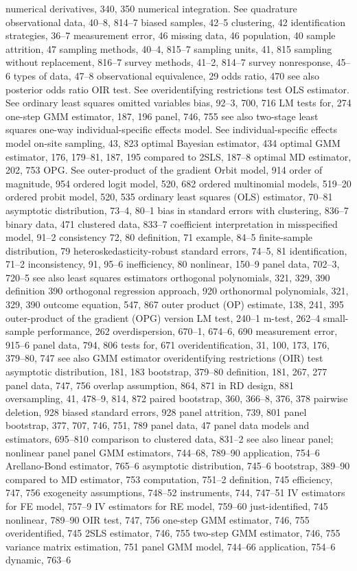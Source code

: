 numerical derivatives, 340, 350 numerical integration. See quadrature
observational data, 40–8, 814–7 biased samples, 42–5 clustering, 42
identification strategies, 36–7 measurement error, 46 missing data, 46
population, 40
sample attrition, 47
sampling methods, 40–4, 815–7 sampling units, 41, 815
sampling without replacement, 816–7 survey methods, 41–2, 814–7
survey nonresponse, 45–6
types of data, 47–8
observational equivalence, 29 odds ratio, 470
see also posterior odds ratio
OIR test. See overidentifying restrictions test OLS estimator. See ordinary least squares omitted variables bias, 92–3, 700, 716
LM tests for, 274
one-step GMM estimator, 187, 196
panel, 746, 755
see also two-stage least squares
one-way individual-specific effects model. See
individual-specific effects model
on-site sampling, 43, 823
optimal Bayesian estimator, 434
optimal GMM estimator, 176, 179–81, 187, 195
compared to 2SLS, 187–8
optimal MD estimator, 202, 753
OPG. See outer-product of the gradient
Orbit model, 914
order of magnitude, 954
ordered logit model, 520, 682
ordered multinomial models, 519–20
ordered probit model, 520, 535
ordinary least squares (OLS) estimator, 70–81
asymptotic distribution, 73–4, 80–1
bias in standard errors with clustering, 836–7 binary data, 471
clustered data, 833–7
coefficient interpretation in misspecified model,
91–2
consistency 72, 80
definition, 71
example, 84–5
finite-sample distribution, 79 heteroskedasticity-robust standard errors, 74–5, 81 identification, 71–2
inconsistency, 91, 95–6
inefficiency, 80
nonlinear, 150–9
panel data, 702–3, 720–5
see also least squares estimators
orthogonal polynomials, 321, 329, 390 definition 390
orthogonal regression approach, 920 orthonormal polynomials, 321, 329, 390 outcome equation, 547, 867
outer product (OP) estimate, 138, 241, 395 outer-product of the gradient (OPG) version
LM test, 240–1
m-test, 262–4
small-sample performance, 262
overdispersion, 670–1, 674–6, 690 measurement error, 915–6 panel data, 794, 806
tests for, 671
overidentification, 31, 100, 173, 176, 379–80, 747 see also GMM estimator
overidentifying restrictions (OIR) test asymptotic distribution, 181, 183 bootstrap, 379–80
definition, 181, 267, 277
panel data, 747, 756 overlap assumption, 864, 871
in RD design, 881 oversampling, 41, 478–9, 814, 872
paired bootstrap, 360, 366–8, 376, 378 pairwise deletion, 928
biased standard errors, 928
panel attrition, 739, 801
panel bootstrap, 377, 707, 746, 751, 789 panel data, 47
panel data models and estimators, 695–810
comparison to clustered data, 831–2 see also linear panel; nonlinear panel panel GMM estimators, 744–68, 789–90
application, 754–6
Arellano-Bond estimator, 765–6 asymptotic distribution, 745–6 bootstrap, 389–90
compared to MD estimator, 753 computation, 751–2
definition, 745
efficiency, 747, 756
exogeneity assumptions, 748–52 instruments, 744, 747–51
IV estimators for FE model, 757–9 IV estimators for RE model, 759–60 just-identified, 745
nonlinear, 789–90
OIR test, 747, 756
one-step GMM estimator, 746, 755 overidentified, 745
2SLS estimator, 746, 755
two-step GMM estimator, 746, 755 variance matrix estimation, 751
panel GMM model, 744–66 application, 754–6 dynamic, 763–6


